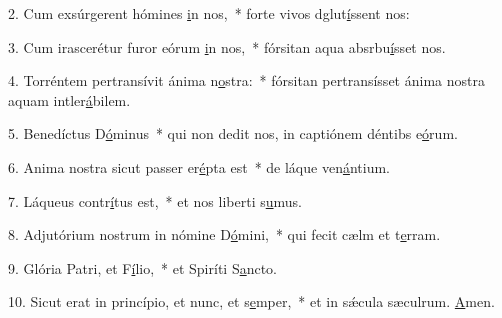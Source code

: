 2. Cum exsúrgerent hómines \uline{i}n nos,~* forte vivos dglut\uline{í}ssent nos:\par 
3. Cum irascerétur furor eórum \uline{i}n nos,~* fórsitan aqua absrbu\uline{í}sset nos.\par 
4. Torréntem pertransívit ánima n\uline{o}stra:~* fórsitan pertransísset ánima nostra aquam intler\uline{á}bilem.\par 
5. Benedíctus D\uline{ó}minus~* qui non dedit nos, in captiónem déntibs e\uline{ó}rum.\par 
6. Anima nostra sicut passer er\uline{é}pta est~* de láque ven\uline{á}ntium.\par 
7. Láqueus contr\uline{í}tus est,~* et nos liberti s\uline{u}mus.\par 
8. Adjutórium nostrum in nómine D\uline{ó}mini,~* qui fecit cælm et t\uline{e}rram.\par 
9. Glória Patri, et F\uline{í}lio,~* et Spiríti S\uline{a}ncto.\par 
10. Sicut erat in princípio, et nunc, et s\uline{e}mper,~* et in sǽcula sæculrum. \uline{A}men.\par 
